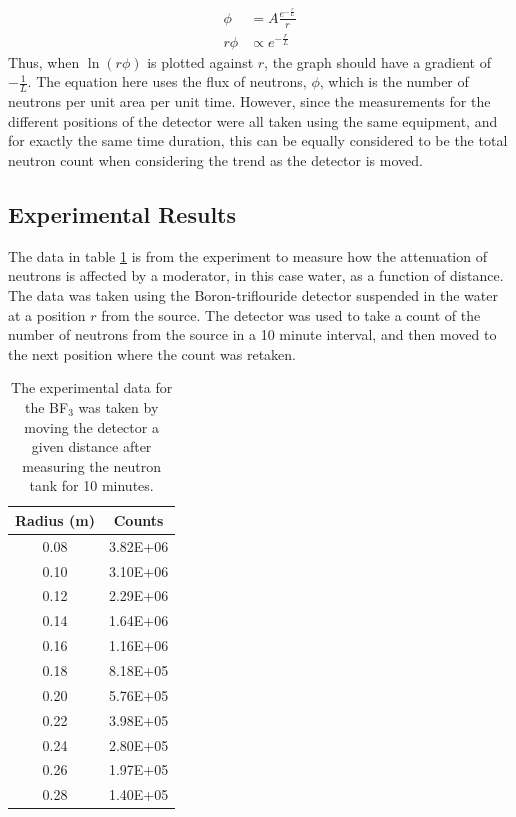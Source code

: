 \begin{align}
  \phi &= A\frac{e^{-\frac{r}{L}}}{r} \\
  r\phi &\propto e^{-\frac{r}{L}}
\end{align}
Thus, when $\ln(r\phi)$ is plotted against $r$, the graph should have a gradient of $-\frac{1}{L}$\cite{krane}. The equation here uses the flux of neutrons, $\phi$, which is the number of neutrons per unit area per unit time. However, since the measurements for the different positions of the detector were all taken using the same equipment, and for exactly the same time duration, this can be equally considered to be the total neutron count when considering the trend as the detector is moved.

\subsection{Experimental Results} %
\label{sub:bf3experimental_results}
The data in table \ref{tab:bf3results} is from the experiment to measure how the attenuation of neutrons is affected by a moderator, in this case water, as a function of distance. The data was taken using the Boron-triflouride detector suspended in the water at a position $r$ from the source. The detector was used to take a count of the number of neutrons from the source in a 10 minute interval, and then moved to the next position where the count was retaken.
\begin{table}[ht]
  \centering
  \begin{tabular}{c|c}
  Radius (m)  &   Counts   \\
  \hline\hline
  0.08        &   3.82E+06 \\
  0.10        &   3.10E+06 \\
  0.12        &   2.29E+06 \\
  0.14        &   1.64E+06 \\
  0.16        &   1.16E+06 \\
  0.18        &   8.18E+05 \\
  0.20        &   5.76E+05 \\
  0.22        &   3.98E+05 \\
  0.24        &   2.80E+05 \\
  0.26        &   1.97E+05 \\
  0.28        &   1.40E+05 \\  
  \end{tabular}
  \caption{The experimental data for the BF$_3$ was taken by moving the detector a given distance after measuring the neutron tank for 10 minutes.\label{tab:bf3results}}
\end{table}

